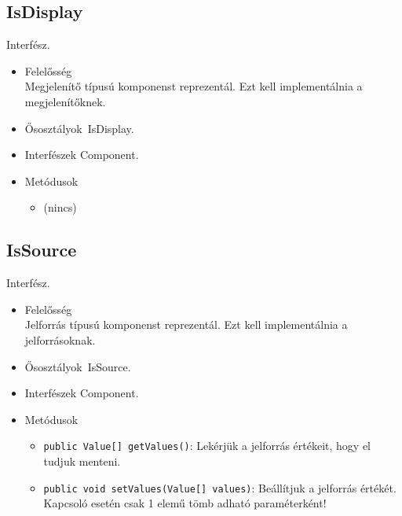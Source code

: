 \subsection{IsDisplay}
Interfész.
\begin{itemize}
\item Felelősség\\
Megjelenítő típusú komponenst reprezentál. Ezt kell implementálnia a megjelenítőknek.
\item Ősosztályok\ IsDisplay.
\item Interfészek Component.
\item Metódusok$\ $
\begin{itemize}
\item (nincs)
\end{itemize}
\end{itemize}

\subsection{IsSource}
Interfész.
\begin{itemize}
\item Felelősség\\
Jelforrás típusú komponenst reprezentál. Ezt kell implementálnia a jelforrásoknak.
\item Ősosztályok\ IsSource.
\item Interfészek Component.
\item Metódusok$\ $
\begin{itemize}
	\item \texttt{public Value[] getValues()}: Lekérjük a jelforrás értékeit, hogy el tudjuk menteni.
	\item \texttt{public void setValues(Value[] values)}: Beállítjuk a jelforrás értékét. Kapcsoló esetén csak 1 elemű tömb  adható paraméterként!
\end{itemize}
\end{itemize}


